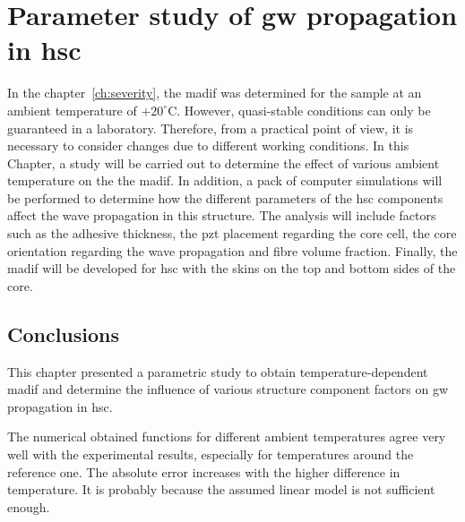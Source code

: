
\chapter[Parameter study of \ac{gw} propagation in \ac{hsc}]{Parameter study of \ac{gw} propagation in \ac{hsc}}
\label{ch:tempEffects}

In the chapter~\ref{ch:severity}, the \ac{madif} was determined for the sample at an ambient temperature of \(+20^{\circ}\)C.
However, quasi-stable conditions can only be guaranteed in a laboratory.
Therefore, from a practical point of view, it is necessary to consider changes due to different working conditions.
In this Chapter, a study will be carried out to determine the effect of various ambient temperature on the the \ac{madif}.
In addition, a pack of computer simulations will be performed to determine how the different parameters of the \ac{hsc} components affect the wave propagation in this structure.
The analysis will include factors such as the adhesive thickness, the \ac{pzt} placement regarding the core cell, the core orientation regarding the wave propagation and fibre volume fraction.
Finally, the \ac{madif} will be developed for \ac{hsc} with the skins on the top and bottom sides of the core.


\section{Conclusions}
\label{sec:conclusionsTemp}
This chapter presented a parametric study to obtain temperature-dependent \ac{madif} and determine the influence of various structure component factors on \ac{gw} propagation in \ac{hsc}.

The numerical obtained functions for different ambient temperatures agree very well with the experimental results, especially for temperatures around the reference one.
The absolute error increases with the higher difference in temperature.
It is probably because the assumed linear model is not sufficient enough.

